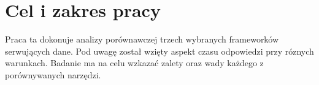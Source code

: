 \section{Cel i zakres pracy}

Praca ta dokonuje analizy porównawczej trzech wybranych frameworków serwujących dane.
Pod uwagę został wzięty aspekt czasu odpowiedzi przy róznych warunkach.
Badanie ma na celu wzkazać zalety oraz wady każdego z porównywanych narzędzi.